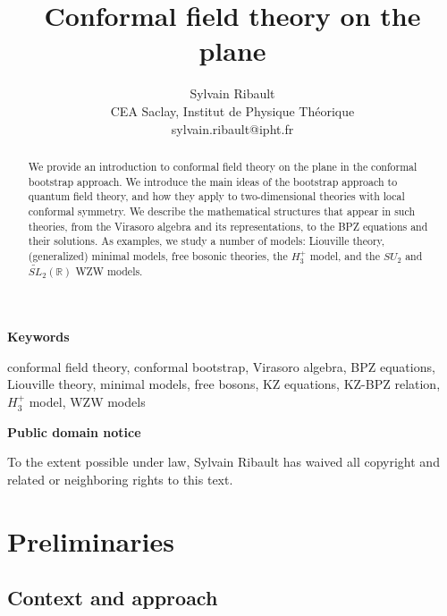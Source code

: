 \documentclass[12pt, a4paper, notitlepage, twoside]{report}
\title{\bfseries Conformal field theory on the plane}
\author{Sylvain Ribault \vspace{2mm}
\\
{\normalsize CEA Saclay, Institut de Physique Th\'eorique}
 \\
 {\footnotesize \ttfamily sylvain.ribault@ipht.fr }
}
\date{}
\numberwithin{equation}{section}
\theoremstyle{break}
\begin{document}
\maketitle


\begin{abstract}
We provide an introduction to conformal field theory on the plane in the conformal bootstrap approach.
We introduce the main ideas of the bootstrap approach to quantum field theory, and how they apply to two-dimensional theories with local conformal symmetry.
We describe the mathematical structures that appear in such theories, from the Virasoro algebra and its representations, to the BPZ equations and their solutions.
As examples, we study a number of models: Liouville theory, (generalized) minimal models, free bosonic theories, the $H_3^+$ model, and the $SU_2$ and $\widetilde{SL}_2(\mathbb{R})$ WZW models. 
\end{abstract}

\vspace{1cm}
\begin{center}
 \textbf{Keywords}
\end{center}
\noindent conformal field theory, conformal bootstrap, Virasoro algebra, BPZ equations, Liouville theory, minimal models, free bosons,
KZ equations, KZ-BPZ relation, $H_3^+$ model, WZW models

\vspace{1cm}
\begin{center}
\textbf{Public domain notice}
\end{center}
\noindent To the extent possible under law, Sylvain Ribault has waived all copyright and related or neighboring rights to this text.

\tableofcontents
\hypersetup{linkcolor=blue}

\addtocounter{chapter}{-1}

\chapter{Preliminaries \label{secprel}}

\section{Context and approach}
\end{document}
